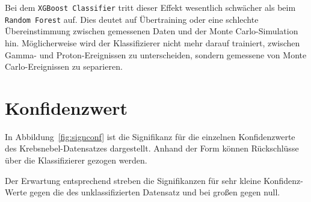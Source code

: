 Bei dem \texttt{XGBoost Classifier} tritt dieser Effekt wesentlich schwächer als beim \texttt{Random Forest} auf. 
Dies deutet auf Übertraining oder eine schlechte Übereinstimmung zwischen gemessenen Daten und der Monte Carlo-Simulation hin.
Möglicherweise wird der Klassifizierer nicht mehr darauf trainiert, zwischen Gamma- und Proton-Ereignissen zu unterscheiden, sondern gemessene von Monte Carlo-Ereignissen zu separieren.

\section{Konfidenzwert}
\label{sec:konf}
In Abbildung~\ref{fig:signconf} ist die Signifikanz für die einzelnen Konfidenzwerte des Krebsnebel-Datensatzes dargestellt. 
Anhand der Form können Rückschlüsse über die Klassifizierer gezogen werden. 

Der Erwartung entsprechend streben die Signifikanzen für sehr kleine Konfidenz-Werte gegen die des unklassifizierten Datensatz und bei großen gegen null.

